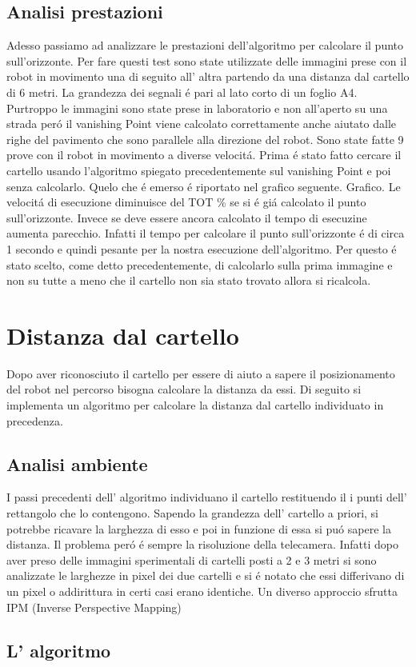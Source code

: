 	\subsection{Analisi prestazioni}
		Adesso passiamo ad analizzare le prestazioni dell'algoritmo per calcolare il punto sull'orizzonte. \newline
		Per fare questi test sono state utilizzate delle immagini prese con il robot in movimento una di seguito all' altra partendo da una distanza dal cartello di 6 metri. La grandezza dei segnali \'e pari al lato corto di un foglio A4. Purtroppo le immagini sono state prese in laboratorio e non all'aperto su una strada per\'o il vanishing Point viene calcolato correttamente anche aiutato dalle righe del pavimento che sono parallele alla direzione del robot. Sono state fatte 9 prove con il robot in movimento a diverse velocit\'a. Prima \'e stato fatto cercare il cartello usando l'algoritmo spiegato precedentemente sul vanishing Point e poi senza calcolarlo. Quelo che \'e emerso \'e riportato nel grafico seguente.
		Grafico.
		Le velocit\'a di esecuzione diminuisce del TOT \% se si \'e gi\'a calcolato il punto sull'orizzonte. Invece se deve essere ancora calcolato il tempo di esecuzine aumenta parecchio. Infatti il tempo per calcolare il punto sull'orizzonte \'e di circa 1 secondo e quindi pesante per la nostra esecuzione dell'algoritmo. Per questo \'e stato scelto, come detto precedentemente, di calcolarlo sulla prima immagine e non su tutte a meno che il cartello non sia stato trovato allora si ricalcola.

\section{Distanza dal cartello}
	
	Dopo aver riconosciuto il cartello per essere di aiuto a sapere il posizionamento del robot nel percorso bisogna calcolare la distanza da essi.
	Di seguito si implementa un algoritmo per calcolare la distanza dal cartello individuato in precedenza.

	\subsection{Analisi ambiente}

		I passi precedenti dell' algoritmo individuano il cartello restituendo il i punti dell' rettangolo che lo contengono. Sapendo la grandezza dell' cartello a priori, si potrebbe ricavare la larghezza di esso e poi in funzione di essa si pu\'o sapere la distanza. Il problema per\'o \'e sempre la risoluzione della telecamera. Infatti dopo aver preso delle immagini sperimentali di cartelli posti a 2 e 3 metri si sono analizzate le larghezze in pixel dei due cartelli e si \'e notato che essi differivano di un pixel o addirittura in certi casi erano identiche.  Un diverso approccio sfrutta IPM (Inverse Perspective Mapping)
		
	\subsection{L' algoritmo}
		
